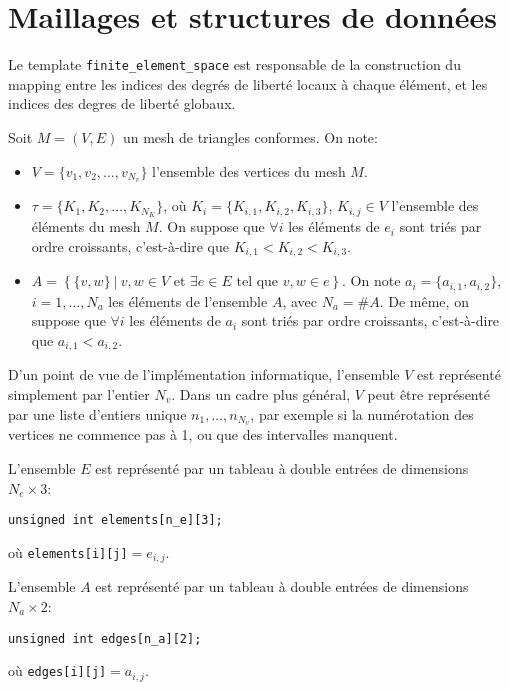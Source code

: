 \section{Maillages et structures de donn\'ees}

Le template \texttt{finite\_element\_space} est responsable de la
construction du mapping entre les indices des degr\'es de libert\'e
locaux \`a chaque \'el\'ement, et les indices des degres de libert\'e
globaux.

Soit $M = (V, E)$ un mesh de triangles conformes. On note:
\begin{itemize}
\item $V = \{v_1, v_2, \dots, v_{N_v}\}$ l'ensemble des vertices du
  mesh $M$.
  
\item $\tau = \{K_1, K_2, \dots, K_{N_K}\}$, o\`u $K_i = \{K_{i,1},
  K_{i,2}, K_{i,3}\}$, $K_{i,j}\in V$ l'ensemble des \'el\'ements du
  mesh $M$. On suppose que $\forall i$ les \'el\'ements de $e_i$ sont tri\'es par
  ordre croissants, c'est-\`a-dire que $K_{i,1} < K_{i,2} < K_{i,3}$.
  
\item $A = \left\{ \{v, w\}\ |\ v,w\in V \text{ et } \exists e\in E
  \text{ tel que } v,w \in e\right\}$. On note $a_i = \{a_{i,1},
  a_{i,2}\}$, $i = 1, \dots, N_{a}$ les \'el\'ements de l'ensemble $A$,
  avec $N_a = \#A$. De m\^eme, on suppose que $\forall i$ les \'el\'ements de
  $a_i$ sont tri\'es par ordre croissants, c'est-\`a-dire
  que $a_{i,1} < a_{i,2}$.
\end{itemize}

D'un point de vue de l'impl\'ementation informatique, l'ensemble $V$
est repr\'esent\'e simplement par l'entier $N_v$. Dans un cadre plus
g\'en\'eral, $V$ peut \^etre repr\'esent\'e par une liste d'entiers
unique ${n_1, \dots, n_{N_v}}$, par exemple si la num\'erotation des
vertices ne commence pas \`a 1, ou que des intervalles manquent.

L'ensemble $E$ est repr\'esent\'e par un tableau \`a double entr\'ees
de dimensions $N_e \times 3$:
\begin{addmargin}[0.5in]{0em}
  \texttt{unsigned int elements[n\_e][3];}
\end{addmargin}
o\`u \texttt{elements[i][j]}$ = e_{i,j}$.

L'ensemble $A$ est repr\'esent\'e par un tableau \`a double entr\'ees
de dimensions $N_a \times 2$:
\begin{addmargin}[0.5in]{0em}
  \texttt{unsigned int edges[n\_a][2];}
\end{addmargin}
o\`u \texttt{edges[i][j]}$ = a_{i,j}$.


